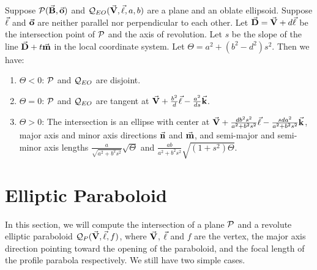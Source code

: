 \begin{theorem}
\label{thm:oblate}
     Suppose ${\cal P}(\vec{\bf B},\vec{\bf o})$ and
${\cal Q}_{EO}(\vec{\bf V},\vec{\bf \ell},a,b)$ are a plane and an oblate
ellipsoid.  Suppose $\vec{\bf \ell}$ and
$\vec{\bf o}$ are neither parallel nor perpendicular to each other.
Let $\vec{\bf D}=\vec{\bf V}+d\vec{\bf \ell}$ be the intersection point of ${\cal P}$
and the axis of revolution.  Let $s$ be the slope of the
line $\vec{\bf D}+t\vec{\bf m}$ in the local coordinate system.
Let $\Theta=a^2+(b^2-d^2)s^2$.  Then we have:
\begin{enumerate}
     \item $\Theta<0$: ${\cal P}$ and ${\cal Q}_{EO}$ are disjoint.
     \item $\Theta=0$: ${\cal P}$ and ${\cal Q}_{EO}$ are tangent at
          $\vec{\bf V}+\frac{b^2}{d}\vec{\bf \ell}-\frac{a^2}{ds}\vec{\bf k}$.
     \item $\Theta>0$: The intersection is an ellipse with center at
          $\vec{\bf V}+\frac{db^2s^2}{a^2+b^2s^2}\vec{\bf \ell}
               -\frac{sda^2}{a^2+b^2s^2}\vec{\bf k}$, major axis and minor axis
          directions $\vec{\bf n}$ and $\vec{\bf m}$, and semi-major and semi-minor
          axis lengths $\frac{a}{\sqrt{a^2+b^2s^2}}\sqrt{\Theta}$ and
          $\frac{ab}{a^2+b^2s^2}\sqrt{(1+s^2)\Theta}$.
\end{enumerate}
\end{theorem}


\section{Elliptic Paraboloid}
\label{section:elliptic-paraboloid}

     In this section, we will compute the intersection of a plane ${\cal P}$
and a revolute elliptic paraboloid ${\cal Q}_P(\vec{\bf V},\vec{\bf \ell},f)$,
where $\vec{\bf V}$, $\vec{\bf \ell}$ and $f$ are the vertex, the major axis
direction pointing toward the opening of the paraboloid, and the focal length
of the profile parabola respectively. We still have two simple cases.

